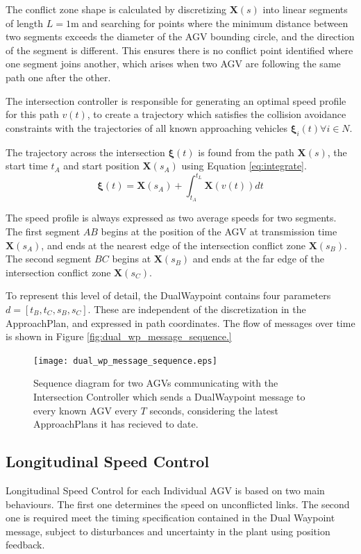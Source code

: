The conflict zone shape is calculated by discretizing $\bm{X}(s)$ into linear segments of length $L=1$m and searching for points where the minimum distance between two segments exceeds the diameter of the AGV bounding circle, and the direction of the segment is different. This ensures there is no conflict point identified where one segment joins another, which arises when two AGV are following the same path one after the other.  

The intersection controller is responsible for generating an optimal speed profile for this path $v(t)$, to create a trajectory which satisfies the collision avoidance constraints with the trajectories of all known approaching vehicles $\bm{\xi}_i(t) \forall i \in N$. 

The trajectory across the intersection $\bm{\xi}(t)$ is found from the path $\bm{X}(s)$, the start time $t_A$ and start position $\bm{X}(s_A)$ using Equation \ref{eq:integrate}.
\begin{equation}
\bm{\xi}(t)  = \bm{X}(s_A) + \int_{t_A}^{t_L} \bm{X}\left( v(t) \right)  dt
\label{eq:integrate}
\end{equation}

The speed profile is always expressed as two average speeds for two segments. The first segment $AB$ begins at the position of the AGV at transmission time $\bm{X}(s_A)$, and ends at the nearest edge of the intersection conflict zone $\bm{X}(s_B)$. The second segment $BC$ begins at $\bm{X}(s_B)$ and ends at the far edge of the intersection conflict zone $\bm{X}(s_C)$.  

To represent this level of detail, the DualWaypoint contains four parameters $d =[t_B, t_C, s_B, s_C]$. These are independent of the discretization in the ApproachPlan, and expressed in path coordinates. The flow of messages over time is shown in Figure \ref{fig:dual_wp_message_sequence.}

\begin{figure}[ht]
	\centering
	\texttt{[image: dual\_wp\_message\_sequence.eps]}
	\caption{Sequence diagram for two AGVs communicating with the Intersection Controller which sends a DualWaypoint message to every known AGV every $T$ seconds, considering the latest ApproachPlans it has recieved to date. }
	\label{fig:dual_wp_message_sequence}
\end{figure}


\subsection{Longitudinal Speed Control}
Longitudinal Speed Control for each Individual AGV is based on two main behaviours. The first one determines the speed on unconflicted links. The second one is required meet the timing specification contained in the Dual Waypoint message, subject to disturbances and uncertainty in the plant using position feedback.  

